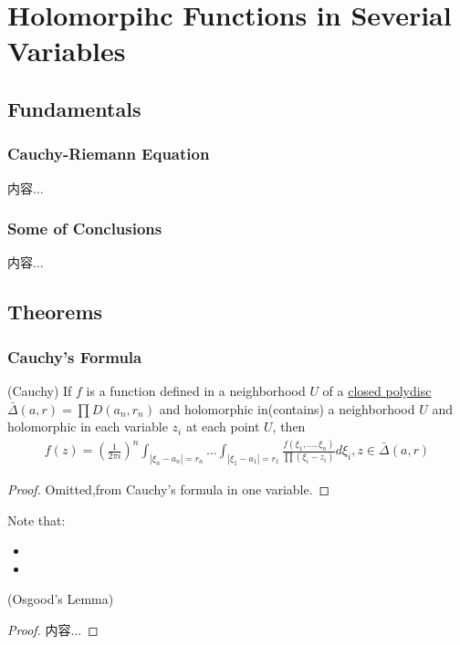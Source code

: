 \documentclass[Total.tex]{subfiles}
\begin{document}
	\chapter{Holomorpihc Functions in Severial Variables}
		\section{Fundamentals}
			\subsection{Cauchy-Riemann Equation}
				\begin{Def}
					内容...
				\end{Def}
			\subsection{Some of Conclusions}
				\begin{lemma}
					内容...
				\end{lemma}
		\section{Theorems}
		\subsection{Cauchy's Formula}
			\begin{proposition}
				(Cauchy) If $f$ is a function defined in a neighborhood $U$ of a \underline{closed polydisc} $\bar{\Delta}(a,r)=\prod D(a_n,r_n)$ and holomorphic in(contains) a neighborhood $U$ and holomorphic in each variable $z_i$ at each point $U$, then
				\begin{gather*}
					f(z)=(\frac{1}{2\pi i})^n \int_{|\xi_n-a_n|=r_n}\dots \int_{|\xi_1-a_1|=r_1} \frac{f(\xi_1,\dots,\xi_n)}{\prod (\xi_i-z_i)} d\xi_i,z\in \bar{\Delta}(a,r)
				\end{gather*}
			\end{proposition}
			\begin{proof}
				Omitted,from Cauchy's formula in one variable.
			\end{proof}
			Note that:
			\begin{itemize}
				\item 
				\item 
			\end{itemize}
			
			\begin{proposition}
				(Osgood's Lemma)
			\end{proposition}
			\begin{proof}
				内容...
			\end{proof}
			
\end{document}

